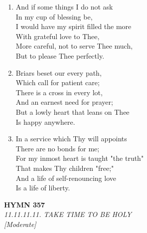\documentclass[11pt,a4paper]{article}
\begin{document}
\begin{enumerate}
    \item And if some things I do not ask \\
        In my cup of blessing be, \\
        I would have my spirit filled the more \\
        With grateful love to Thee, \\
        More careful, not to serve Thee much, \\
        But to please Thee perfectly.

    \item Briars beset our every path, \\
        Which call for patient care; \\
        There is a cross in every lot, \\
        And an earnest need for prayer; \\
        But a lowly heart that leans on Thee \\
        Is happy anywhere.

    \item In a service which Thy will appoints \\
        There are no bonds for me; \\
        For my inmost heart is taught "the truth" \\
        That makes Thy children "free;" \\
        And a life of self-renouncing love \\
        Is a life of liberty.

\end{enumerate}

\newpage
\begin{center}
    {\Large \textbf{HYMN 357}}
    \\
    \textit{11.11.11.11. TAKE TIME TO BE HOLY}
    \\
    \textit{\small [Moderate]}
\end{center}
\vspace{1em}
\end{document}
